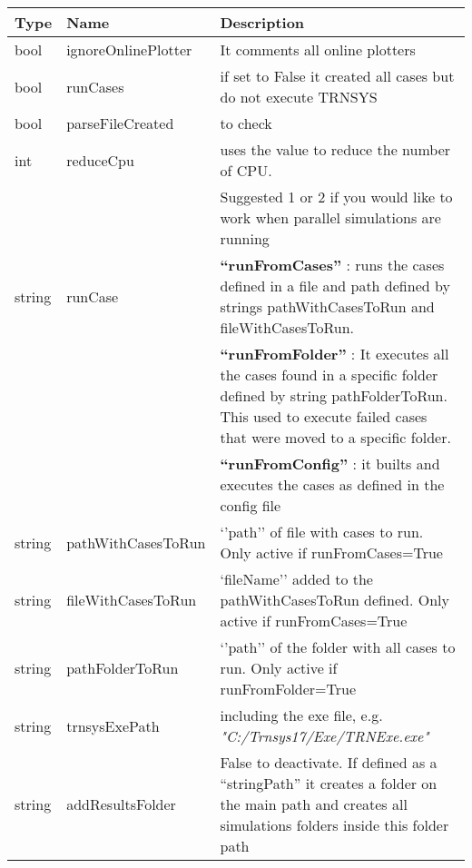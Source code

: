 \documentclass[english]{SPFReport}
\begin{document}

\begin{tabular}{| p{15mm} |  p{35mm} | p{100mm}  |}
\hline
\textbf{Type} & \textbf{Name} & \textbf{Description} \\
\hline
 bool & ignoreOnlinePlotter &  It comments all online plotters  \\
 bool & runCases & if set to False it created all cases but do not execute TRNSYS  \\
 bool & parseFileCreated &  to check  \\
 int & reduceCpu &  uses the value to reduce the number of CPU. \\&&Suggested 1 or 2 if you would like to work when parallel simulations are running  \\
string & runCase & \textbf{``runFromCases''} : runs the cases defined in a file and path defined by strings pathWithCasesToRun and fileWithCasesToRun. \\
&& \textbf{``runFromFolder''} : It executes all the cases found in a specific folder defined by string pathFolderToRun. This used to execute failed cases that were moved to a specific folder. \\
&& \textbf{``runFromConfig''} : it builts and executes the cases as defined in the config file \\
string & pathWithCasesToRun & `'path'' of file with cases to run. Only active if runFromCases=True \\
string & fileWithCasesToRun & `fileName'' added to the pathWithCasesToRun defined. Only active if runFromCases=True \\
string & pathFolderToRun & `'path'' of the folder with all cases to run. Only active if runFromFolder=True \\
 string & trnsysExePath & including the exe file, e.g. \textit{"C:/Trnsys17/Exe/TRNExe.exe"} \\
 string & addResultsFolder & False to deactivate. If defined as a ``stringPath'' it creates a folder on the main path and creates all simulations folders inside this folder path\\

\end{tabular}
\end{document}
